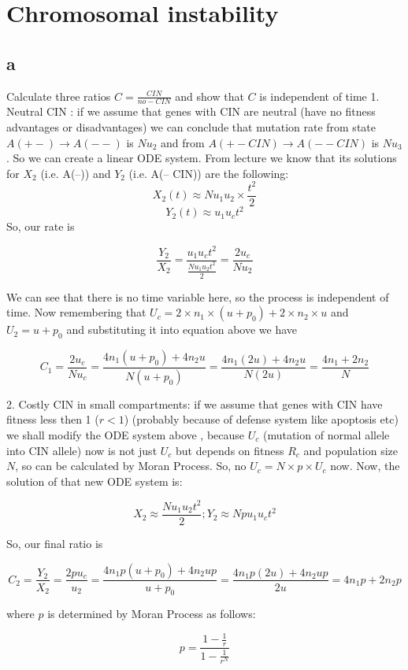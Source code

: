\newcommand{\package}{\emph}

\setcounter{chapter}{1}
\setcounter{section}{0}
\section{Chromosomal instability}
\subsection{a}
Calculate three ratios $C= \frac{CIN}{no-CIN}$ and show that $C$ is independent of time
1.	Neutral CIN : if we assume that genes with CIN are neutral (have no fitness advantages or disadvantages) we can conclude that mutation rate from state $A(+-) \rightarrow A(--)$ is $Nu_2$ and from $A (+- CIN) \rightarrow A(-- CIN)$ is $Nu_3$. So we can create a linear ODE system. 
From lecture we know that its solutions for  $X_2$ (i.e. A(--)) and $Y_2$ (i.e. A(-- CIN)) are the following:
\[X_2(t) \approx Nu_1u_2 \times \frac{t^2}{2} \]
\[Y_2(t) \approx u_1u_ct^2\]
So, our rate is

\[ \frac{Y_2}{X_2} = \frac{u_1u_ct^2}{\frac{Nu_1u_2t^2}{2}} = \frac{2u_c}{Nu_2}\]

We can see that there is no time variable here, so the process is independent of time. 
Now remembering that $U_c = 2\times n_1\times(u+p_0)+2\times n_2\times u$  and  $U_2 = u+p_0$ and substituting it into equation above we have

\[ C_1 = \frac{2u_c}{Nu_c} = \frac{4n_1(u+p_0) + 4n_2u}{N(u+p_0)} = \frac{4n_1(2u)+4n_2u}{N(2u)} = \frac{4n_1+2n_2}{N}\]

2. Costly CIN in small compartments: if we assume that genes with CIN have fitness less then 1 ($r<1$) (probably because of defense system like apoptosis etc) we shall modify the ODE system above , because $U_c$ (mutation of normal allele into CIN allele) now is not just $U_c$ but depends on fitness $R_c$ and population size $N$, so can be calculated by Moran Process. So, no $U_c = N\times p \times U_c$  now.
Now, the solution of that new ODE system is:

\[ X_2 \approx \frac{Nu_1u_2t^2}{2} ; Y_2 \approx Npu_1u_ct^2 \]

So, our final ratio is

\[ C_2 = \frac{Y_2}{X_2} = \frac{2pu_c}{u_2} = \frac{4n_1p(u+p_0) + 4n_2up}{u+p_0} = \frac{4n_1p(2u)+4n_2up}{2u} = 4n_1p+2n_2p \]

where $p$ is determined by Moran Process as follows:

\[  p = \frac{1-\frac{1}{r}}{1-\frac{1}{r^N}} \]

